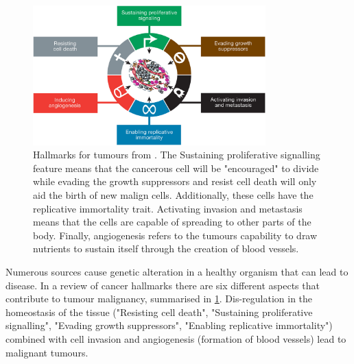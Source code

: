 \begin{figure}[!htb]
  \centering\includegraphics[width=0.8\textwidth,height=0.8\textheight,keepaspectratio]{Sections/Lit_review/Resources/tumour_causes.jpeg}
    \caption[Hallmarks of the tumours]{Hallmarks for tumours from \citep{Hanahan2011-px}. The Sustaining proliferative signalling feature means that the cancerous cell will be "encouraged" to divide while evading the growth suppressors and resist cell death will only aid the birth of new malign cells. Additionally, these cells have the replicative immortality trait. Activating invasion and metastasis means that the cells are capable of spreading to other parts of the body. Finally, angiogenesis refers to the tumours capability to draw nutrients to sustain itself through the creation of blood vessels. }
    \label{fig:hallmarks_cancer}
\end{figure}


Numerous sources cause genetic alteration in a healthy organism that can lead to disease. In a review of cancer hallmarks \citep{Hanahan2011-px} there are six different aspects that contribute to tumour malignancy, summarised in \cref{fig:hallmarks_cancer}.  Dis-regulation in the homeostasis of the tissue ("Resisting cell death",  "Sustaining proliferative signalling", "Evading growth suppressors", "Enabling replicative immortality") combined with cell invasion and angiogenesis (formation of blood vessels) lead to malignant tumours. 

